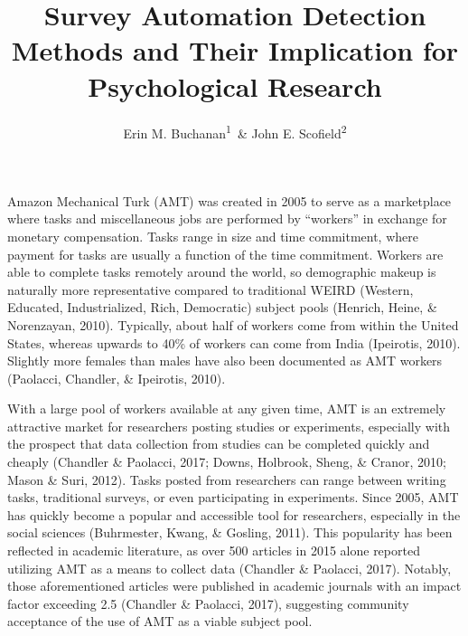 \documentclass[english,man]{apa6}
\title{Survey Automation Detection Methods and Their Implication for
Psychological Research}
\author{Erin M. Buchanan\textsuperscript{1}~\& John E. Scofield\textsuperscript{2}}
\affiliation{
    \vspace{0.5cm}
          \textsuperscript{1} Missouri State University\\
          \textsuperscript{2} University of Missouri  }
\theoremstyle{definition}
\theoremstyle{definition}
\theoremstyle{definition}
\theoremstyle{remark}
\begin{document}
\maketitle

\setcounter{secnumdepth}{0}



Amazon Mechanical Turk (AMT) was created in 2005 to serve as a
marketplace where tasks and miscellaneous jobs are performed by
\enquote{workers} in exchange for monetary compensation. Tasks range in
size and time commitment, where payment for tasks are usually a function
of the time commitment. Workers are able to complete tasks remotely
around the world, so demographic makeup is naturally more representative
compared to traditional WEIRD (Western, Educated, Industrialized, Rich,
Democratic) subject pools (Henrich, Heine, \& Norenzayan, 2010).
Typically, about half of workers come from within the United States,
whereas upwards to 40\% of workers can come from India (Ipeirotis,
2010). Slightly more females than males have also been documented as AMT
workers (Paolacci, Chandler, \& Ipeirotis, 2010).

With a large pool of workers available at any given time, AMT is an
extremely attractive market for researchers posting studies or
experiments, especially with the prospect that data collection from
studies can be completed quickly and cheaply (Chandler \& Paolacci,
2017; Downs, Holbrook, Sheng, \& Cranor, 2010; Mason \& Suri, 2012).
Tasks posted from researchers can range between writing tasks,
traditional surveys, or even participating in experiments. Since 2005,
AMT has quickly become a popular and accessible tool for researchers,
especially in the social sciences (Buhrmester, Kwang, \& Gosling, 2011).
This popularity has been reflected in academic literature, as over 500
articles in 2015 alone reported utilizing AMT as a means to collect data
(Chandler \& Paolacci, 2017). Notably, those aforementioned articles
were published in academic journals with an impact factor exceeding 2.5
(Chandler \& Paolacci, 2017), suggesting community acceptance of the use
of AMT as a viable subject pool.
\end{document}
